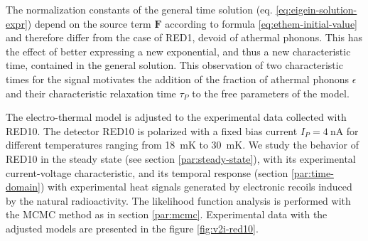 The normalization constants of the general time solution (eq. \ref{eq:eigein-solution-expr}) depend on the source term $\bm{F}$ according to formula \ref{eq:ethem-initial-value} and therefore differ from the case of RED1, devoid of athermal phonons. This has the effect of better expressing a new exponential, and thus a new characteristic time, contained in the general solution. This observation of two characteristic times for the signal motivates the addition of the fraction of athermal phonons $\epsilon$ and their characteristic relaxation time $\tau_P$ to the free parameters of the model.

The electro-thermal model is adjusted to the experimental data collected with RED10. The detector RED10 is polarized with a fixed bias current $I_P = \SI{4}{\nano\ampere}$ for different temperatures ranging from \SI{18}{\milli\kelvin} to \SI{30}{\milli\kelvin}. We study the behavior of RED10 in the steady state (see section \ref{par:steady-state}), with its experimental current-voltage characteristic, and its temporal response (section \ref{par:time-domain}) with experimental heat signals generated by electronic recoils induced by the natural radioactivity. The likelihood function analysis is performed with the MCMC method as in section \ref{par:mcmc}. Experimental data with the adjusted models are presented in the figure \ref{fig:v2i-red10}.


